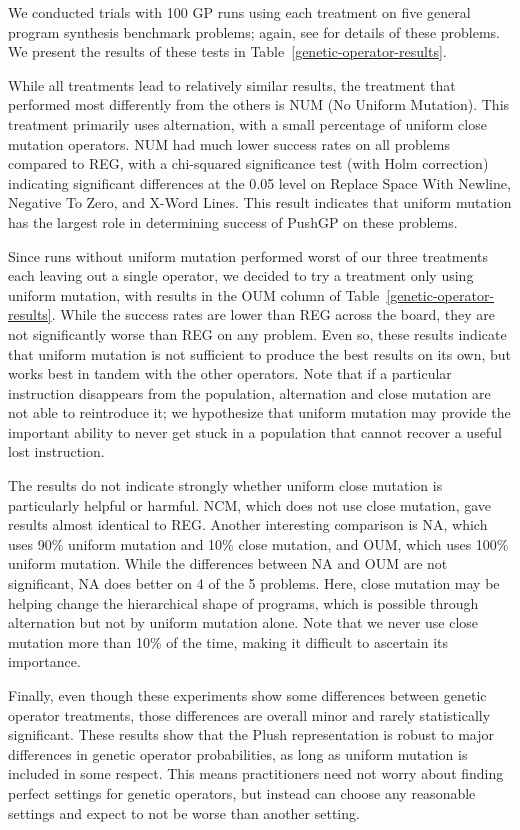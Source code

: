 \documentclass[graybox]{svmult}
\begin{document}
We conducted trials with 100 GP runs using each treatment on five general program synthesis benchmark problems; again, see \cite{Helmuth:2015:GECCO} for details of these problems. We present the results of these tests in Table~\ref{genetic-operator-results}.

While all treatments lead to relatively similar results, the treatment that performed most differently from the others is NUM (No Uniform Mutation). This treatment primarily uses alternation, with a small percentage of uniform close mutation operators. NUM had much lower success rates on all problems compared to REG, with a chi-squared significance test (with Holm correction) indicating significant differences at the 0.05 level on Replace Space With Newline, Negative To Zero, and X-Word Lines. This result indicates that uniform mutation has the largest role in determining success of PushGP on these problems.

Since runs without uniform mutation performed worst of our three treatments each leaving out a single operator, we decided to try a treatment only using uniform mutation, with results in the OUM column of Table~\ref{genetic-operator-results}. While the success rates are lower than REG across the board, they are not significantly worse than REG on any problem. Even so, these results indicate that uniform mutation is not sufficient to produce the best results on its own, but works best in tandem with the other operators. Note that if a particular instruction disappears from the population, alternation and close mutation are not able to reintroduce it; we hypothesize that uniform mutation may provide the important ability to never get stuck in a population that cannot recover a useful lost instruction.

The results do not indicate strongly whether uniform close mutation is particularly helpful or harmful. NCM, which does not use close mutation, gave results almost identical to REG. Another interesting comparison is NA, which uses 90\% uniform mutation and 10\% close mutation, and OUM, which uses 100\% uniform mutation. While the differences between NA and OUM are not significant, NA does better on 4 of the 5 problems. Here, close mutation may be helping change the hierarchical shape of programs, which is possible through alternation but not by uniform mutation alone. Note that we never use close mutation more than 10\% of the time, making it difficult to ascertain its importance.

Finally, even though these experiments show some differences between genetic operator treatments, those differences are overall minor and rarely statistically significant. These results show that the Plush representation is robust to major differences in genetic operator probabilities, as long as uniform mutation is included in some respect. This means practitioners need not worry about finding perfect settings for genetic operators, but instead can choose any reasonable settings and expect to not be worse than another setting.
\end{document}
